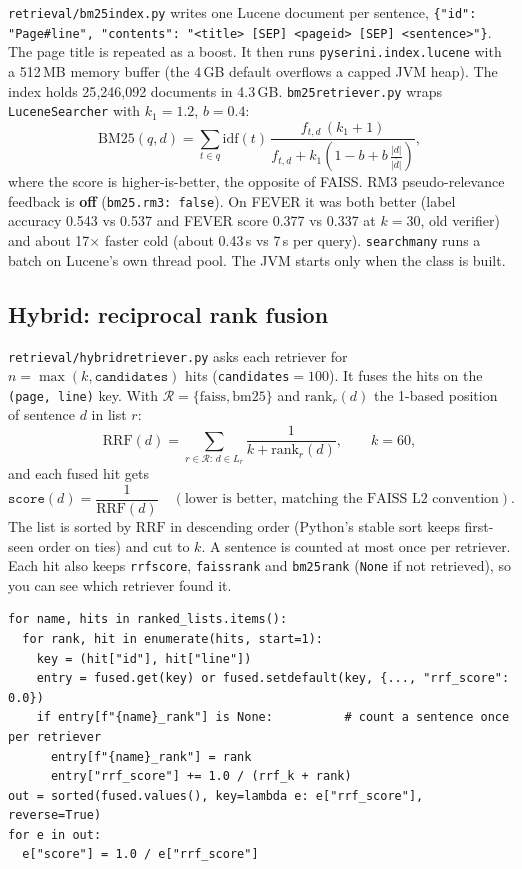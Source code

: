 \documentclass[11pt,a4paper]{article}
\makeatletter
\DeclareRobustCommand{\_}{\ifmmode\nfss@text{\textunderscore}\else\textunderscore\allowbreak\fi}
\newcommand{\file}[1]{\texttt{#1}}
\makeatother
\begin{document}
\file{retrieval/bm25\_index.py} writes one Lucene document per sentence,
\texttt{\{"id": "Page\#line", "contents": "<title> [SEP] <page\_id> [SEP] <sentence>"\}}. The page title is
repeated as a boost. It then runs \texttt{pyserini.index.lucene} with a 512\,MB memory buffer (the 4\,GB default
overflows a capped JVM heap). The index holds 25{,}246{,}092 documents in 4.3\,GB. \file{bm25\_retriever.py} wraps
\texttt{LuceneSearcher} with $k_1=1.2$, $b=0.4$:
\[
  \mathrm{BM25}(q,d) = \sum_{t\in q} \mathrm{idf}(t)\,
     \frac{f_{t,d}\,(k_1+1)}{f_{t,d} + k_1\left(1-b+b\,\frac{|d|}{\overline{|d|}}\right)} ,
\]
where the score is higher-is-better, the opposite of FAISS. RM3 pseudo-relevance feedback is \textbf{off}
(\texttt{bm25.rm3: false}). On FEVER it was both better (label accuracy 0.543 vs 0.537 and FEVER score 0.377 vs
0.337 at $k=30$, old verifier) and about 17$\times$ faster cold (about 0.43\,s vs 7\,s per query).
\texttt{search\_many} runs a batch on Lucene's own thread pool. The JVM starts only when the class is built.

\subsection{Hybrid: reciprocal rank fusion}

\file{retrieval/hybrid\_retriever.py} asks each retriever for $n=\max(k, \texttt{candidates})$ hits
(\texttt{candidates}$=100$). It fuses the hits on the \texttt{(page, line)} key. With $\mathcal{R}=\{\text{faiss},
\text{bm25}\}$ and $\mathrm{rank}_r(d)$ the 1-based position of sentence $d$ in list $r$:
\[
  \mathrm{RRF}(d)=\sum_{r\in\mathcal{R}:\,d\in L_r} \frac{1}{k+\mathrm{rank}_r(d)}, \qquad k=60,
\]
and each fused hit gets
\[
  \texttt{score}(d) = \frac{1}{\mathrm{RRF}(d)} \quad(\text{lower is better, matching the FAISS L2 convention}).
\]
The list is sorted by $\mathrm{RRF}$ in descending order (Python's stable sort keeps first-seen order on ties) and cut
to $k$. A sentence is counted at most once per retriever. Each hit also keeps \texttt{rrf\_score},
\texttt{faiss\_rank} and \texttt{bm25\_rank} (\texttt{None} if not retrieved), so you can see which retriever found
it.

\begin{lstlisting}
for name, hits in ranked_lists.items():
  for rank, hit in enumerate(hits, start=1):
    key = (hit["id"], hit["line"])
    entry = fused.get(key) or fused.setdefault(key, {..., "rrf_score": 0.0})
    if entry[f"{name}_rank"] is None:          # count a sentence once per retriever
      entry[f"{name}_rank"] = rank
      entry["rrf_score"] += 1.0 / (rrf_k + rank)
out = sorted(fused.values(), key=lambda e: e["rrf_score"], reverse=True)
for e in out:
  e["score"] = 1.0 / e["rrf_score"]
\end{lstlisting}
\end{document}
